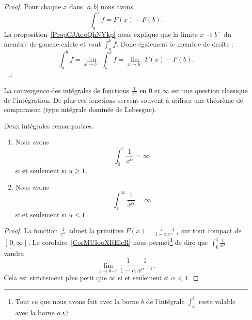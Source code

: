 \begin{proof}
	Pour chaque \( x\) dans \( \mathopen[ a , b [\) nous avons
	\begin{equation}
		\int_a^xf=F(x)-F(b).
	\end{equation}
	La proposition~\ref{PropCJAooQhNYkp} nous explique que la limite \( x\to b^-\) du membre de gauche existe et vaut \( \int_a^bf\). Donc également le membre de droite :
	\begin{equation}
		\int_a^bf=\lim_{x\to b^-} \int_a^xf=\lim_{x\to b^-} F(x)-F(b).
	\end{equation}
\end{proof}

La convergence des intégrales de fonctions \( \frac{1}{ x^{\alpha} }\) en \( 0\) et \( \infty\) est une question classique de l'intégration. De plus ces fonctions servent souvent à utiliser une théorème de comparaison (type intégrale dominée de Lebesgue).
\begin{proposition} \label{PropBKNooPDIPUc}
	Deux intégrales remarquables.
	\begin{enumerate}
		\item

		      Nous avons
		      \begin{equation}
			      \int_0^1\frac{1}{ x^\alpha }=\infty
		      \end{equation}
		      si et seulement si \( \alpha\geq 1\).

		\item   \label{ITEMooJFSXooHmgmEj}

		      Nous avons
		      \begin{equation}
			      \int_1^{\infty}\frac{1}{ x^{\alpha} }=\infty
		      \end{equation}
		      si et seulement si \( \alpha\leq1\).

	\end{enumerate}

\end{proposition}

\begin{proof}
	La fonction \( \frac{1}{ x^{\alpha} }\) admet la primitive \( F(x)=\frac{1}{ 1-\alpha }\frac{1}{ x^{\alpha-1} }\) sur tout compact de \( \mathopen] 0 , \infty \mathclose[\). Le corolaire~\ref{CorMUIooXREleR} nous permet\footnote{Tout ce que nous avons fait avec la borne \( b\) de l'intégrale \( \int_a^b\) reste valable avec la borne \( a\).} de dire que \( \int_0^1\frac{1}{ x^{\alpha} }\) vaudra
	\begin{equation}
		\lim_{x\to 0-^+} \frac{1}{ 1-\alpha }\frac{1}{ x^{\alpha-1} }.
	\end{equation}
	Cela est strictement plus petit que \( \infty\) si et seulement si \( \alpha<1\).
\end{proof}


